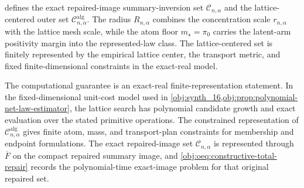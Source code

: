  defines the exact repaired-image summary-inversion set \(\mathcal C_{n,\alpha}\) and the lattice-centered outer set \(\mathcal C^{\mathrm{alg}}_{n,\alpha}\). The radius \(R_{n,\alpha}\) combines the concentration scale \(r_{n,\alpha}\) with the lattice mesh scale, while the atom floor \(m_\star=\pi_0\) carries the latent-arm positivity margin into the represented-law class. The lattice-centered set is finitely represented by the empirical lattice center, the transport metric, and fixed finite-dimensional constraints in the exact-real model.

The computational guarantee is an exact-real finite-representation statement. In the fixed-dimensional unit-cost model used in \cref{obj:synth_16,obj:prop:polynomial-net-law-estimator}, the lattice search has polynomial candidate growth and exact evaluation over the stated primitive operations. The constrained representation of \(\mathcal C^{\mathrm{alg}}_{n,\alpha}\) gives finite atom, mass, and transport-plan constraints for membership and endpoint formulations. The exact repaired-image set \(\mathcal C_{n,\alpha}\) is represented through \(\overline F\) on the compact repaired summary image, and \cref{obj:oeq:constructive-total-repair} records the polynomial-time exact-image problem for that original repaired set.

